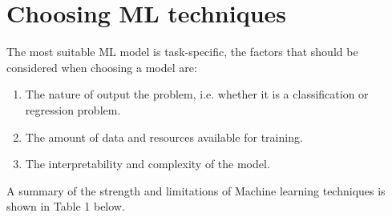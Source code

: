 \documentclass[aps,prb,twocolumn,superscriptaddress,floatfix]{revtex4-2}
\begin{document}
\section{Choosing ML techniques}
The most suitable ML model is task-specific, the factors that should be considered when choosing a model are:
\begin{enumerate}
    \item The nature of output the problem, i.e. whether it is a classification or regression problem.
    \item The amount of data and resources available for training.
    \item The interpretability and complexity of the model.
\end{enumerate}
A summary of the strength and limitations of Machine learning techniques is shown in Table 1 below.\\
\end{document}
